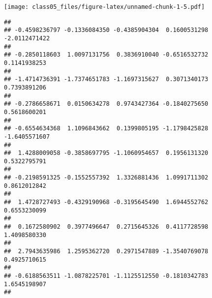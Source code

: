 \documentclass[]{article}
\newenvironment{Shaded}{\begin{snugshade}}{\end{snugshade}}
\newcommand{\KeywordTok}[1]{\textcolor[rgb]{0.13,0.29,0.53}{\textbf{#1}}}
\newcommand{\DataTypeTok}[1]{\textcolor[rgb]{0.13,0.29,0.53}{#1}}
\newcommand{\DecValTok}[1]{\textcolor[rgb]{0.00,0.00,0.81}{#1}}
\newcommand{\CommentTok}[1]{\textcolor[rgb]{0.56,0.35,0.01}{\textit{#1}}}
\newcommand{\OperatorTok}[1]{\textcolor[rgb]{0.81,0.36,0.00}{\textbf{#1}}}
\newcommand{\NormalTok}[1]{#1}
\begin{document}
\texttt{[image: class05\_files/figure-latex/unnamed-chunk-1-5.pdf]}

\begin{Shaded}
\end{Shaded}

\begin{verbatim}
##                                                                       
## -0.4598236797 -0.1336084350 -0.4385904304  0.1600531298 -2.0112471422 
##                                                                       
## -0.2850118603  1.0097131756  0.3836910040 -0.6516532732  0.1141938253 
##                                                                       
## -1.4714736391 -1.7374651783 -1.1697315627  0.3071340173  0.7393891206 
##                                                                       
## -0.2786658671  0.0150634278  0.9743427364 -0.1840275650  0.5618600201 
##                                                                       
## -0.6554634368  1.1096843662  0.1399805195 -1.1798425828 -1.6405571607 
##                                                                       
##  1.4288009058 -0.3858697795 -1.1060954657  0.1956131320  0.5322795791 
##                                                                       
## -0.2198591325 -0.1552557392  1.3326881436  1.0991711302  0.8612012842 
##                                                                       
##  1.4728727493 -0.4329190968 -0.3195645490  1.6944552762  0.6553230099 
##                                                                       
##  0.1672580902  0.3977496647  0.2715645326  0.4117728598  1.4098580330 
##                                                                       
##  2.7943635986  1.2595362720  0.2971547889 -1.3540769078  0.4925710615 
##                                                                       
## -0.6188563511 -1.0878225701 -1.1125512550 -0.1810342783  1.6545198907 
##                                                                       

\end{verbatim}
\end{document}
